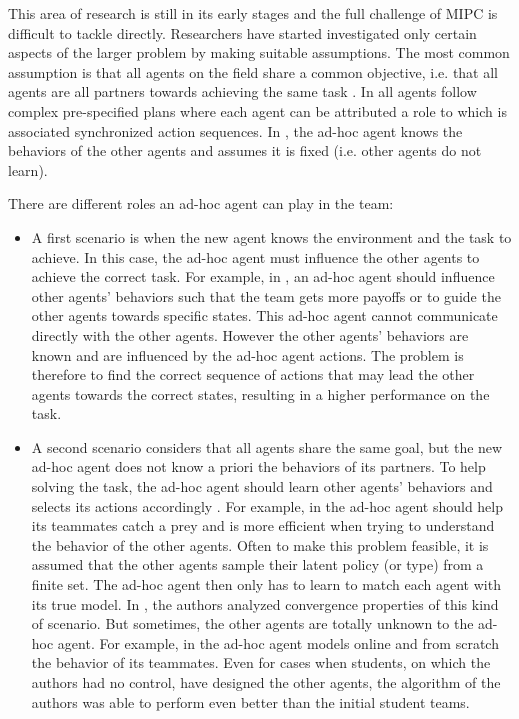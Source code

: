 This area of research is still in its early stages and the full challenge of MIPC is difficult to tackle directly. Researchers have started investigated only certain aspects of the larger problem by making suitable assumptions. The most common assumption is that all agents on the field share a common objective, i.e. that all agents are all partners towards achieving the same task \cite{barrett2011empirical}. In \cite{bowling2005coordination,gil2006dynamically} all agents follow complex pre-specified plans where each agent can be attributed a role to which is associated synchronized action sequences. In \cite{stone2010teach,stone2013teaching}, the ad-hoc agent knows the behaviors of the other agents and assumes it is fixed (i.e. other agents do not learn). 

There are different roles an ad-hoc agent can play in the team:

\begin{itemize}

\item A first scenario is when the new agent knows the environment and the task to achieve. In this case, the ad-hoc agent must influence the other agents to achieve the correct task. For example, in  \cite{stone2010teach,stone2013teaching}, an ad-hoc agent should influence other agents' behaviors such that the team gets more payoffs or to guide the other agents towards specific states. This ad-hoc agent cannot communicate directly with the other agents. However the other agents' behaviors are known and are influenced by the ad-hoc agent actions. The problem is therefore to find the correct sequence of actions that may lead the other agents towards the correct states, resulting in a higher performance on the task. 

\item A second scenario considers that all agents share the same goal, but the new ad-hoc agent does not know a priori the behaviors of its partners. To help solving the task, the ad-hoc agent should learn other agents' behaviors and selects its actions accordingly  \cite{barrett2011adhoc,barrett2011empirical,barrett2013team}. For example, in \cite{barrett2011empirical} the ad-hoc agent should help its teammates catch a prey and is more efficient when trying to understand the behavior of the other agents. Often to make this problem feasible, it is assumed that the other agents sample their latent policy (or type) from a finite set. The ad-hoc agent then only has to learn to match each agent with its true model. In \cite{albrecht2014uai}, the authors analyzed convergence properties of this kind of scenario. But sometimes, the other agents are totally unknown to the ad-hoc agent. For example, in \cite{barrett2011empirical} the ad-hoc agent models online and from scratch the behavior of its teammates. Even for cases when students, on which the authors had no control, have designed the other agents, the algorithm of the authors was able to perform even better than the initial student teams.

\end{itemize}

